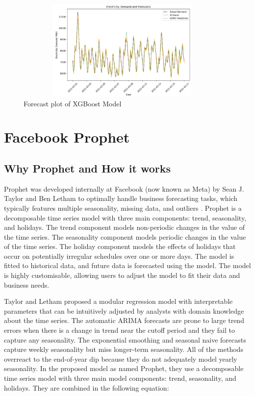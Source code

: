 \documentclass[mstat,12pt]{unswthesis}
\begin{document}
\begin{figure}[H]
\centering
\includegraphics[width=0.95\textwidth, height=5cm]{forecastplot.png}
\caption{Forecast plot of XGBoost Model}\label{forecastplot}
\end{figure}

\section{Facebook Prophet}\label{facebook-prophet}

\subsection{Why Prophet and How it
works}\label{why-prophet-and-how-it-works}

Prophet was developed internally at Facebook (now known as Meta) by Sean
J. Taylor and Ben Letham to optimally handle business forecasting tasks,
which typically features multiple seasonality, missing data, and
outliers \cite{taylor2017facebook}. Prophet is a decomposable time
series model with three main components: trend, seasonality, and
holidays. The trend component models non-periodic changes in the value
of the time series. The seasonality component models periodic changes in
the value of the time series. The holiday component models the effects
of holidays that occur on potentially irregular schedules over one or
more days. The model is fitted to historical data, and future data is
forecasted using the model. The model is highly customisable, allowing
users to adjust the model to fit their data and business needs.

Taylor and Letham \cite{taylor2017facebook} proposed a modular
regression model with interpretable parameters that can be intuitively
adjusted by analysts with domain knowledge about the time series. The
automatic ARIMA forecasts are prone to large trend errors when there is
a change in trend near the cutoff period and they fail to capture any
seasonality. The exponential smoothing and seasonal naive forecasts
capture weekly seasonality but miss longer-term seasonality. All of the
methods overreact to the end-of-year dip because they do not adequately
model yearly seasonality. In the proposed model as named Prophet, they
use a decomposable time series model with three main model components:
trend, seasonality, and holidays. They are combined in the following
equation:
\end{document}
